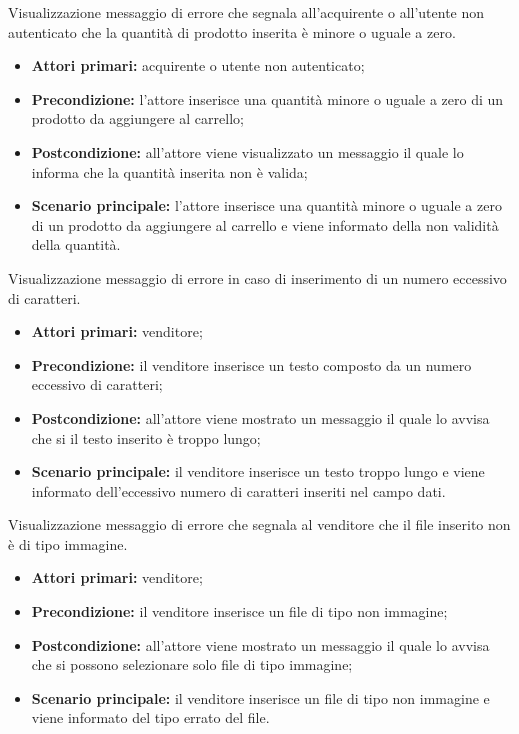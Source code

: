 Visualizzazione messaggio di errore che segnala all'acquirente o all'utente non autenticato che la quantità di prodotto inserita è minore o uguale a zero.
\begin{itemize}
    \item \textbf{Attori primari:} acquirente o utente non autenticato;
    \item \textbf{Precondizione:} l'attore inserisce una quantità minore o uguale a zero di un prodotto da aggiungere al carrello;
    \item \textbf{Postcondizione:} all'attore viene visualizzato un messaggio il quale lo informa che la quantità inserita non è valida;
    \item \textbf{Scenario principale:} l'attore inserisce una quantità minore o uguale a zero di un prodotto da aggiungere al carrello e viene informato della non validità della quantità.
\end{itemize}

\label{estensione:numero-eccessivo-caratteri}

Visualizzazione messaggio di errore in caso di inserimento di un numero eccessivo di caratteri.
\begin{itemize}
	\item \textbf{Attori primari:} venditore;
	\item \textbf{Precondizione:} il venditore inserisce un testo composto da un numero eccessivo di caratteri;
	\item \textbf{Postcondizione:} all'attore viene mostrato un messaggio il quale lo avvisa che si il testo inserito è troppo lungo;
	\item \textbf{Scenario principale:} il venditore inserisce un testo troppo lungo e viene informato dell'eccessivo numero di caratteri inseriti nel campo dati.
\end{itemize}

\label{estensione:file-no-tipo-immagine}

Visualizzazione messaggio di errore che segnala al venditore che il file inserito non è di tipo immagine.
\begin{itemize}
    \item \textbf{Attori primari:} venditore;
    \item \textbf{Precondizione:} il venditore inserisce un file di tipo non immagine;
    \item \textbf{Postcondizione:} all'attore viene mostrato un messaggio il quale lo avvisa che si possono selezionare solo file di tipo immagine;
    \item \textbf{Scenario principale:} il venditore inserisce un file di tipo non immagine e viene informato del tipo errato del file.
\end{itemize}

